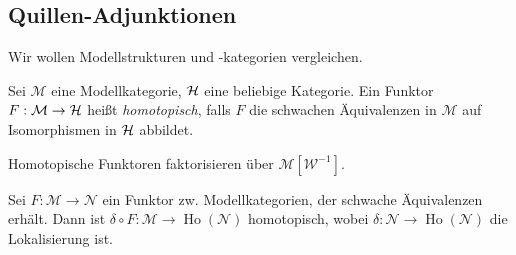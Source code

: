 \documentclass{cheat-sheet}
\newcommand{\Weak}{\mathcal{W}} %
\newcommand{\ModC}{\mathcal{M}} %
\newcommand{\NodC}{\mathcal{N}} %
\DeclareMathOperator{\Ho}{Ho} %
\newenvironment{centertikzcd}
  {\begin{center}\begin{tikzcd}}
  {\end{tikzcd}\end{center}}
\begin{document}



\subsection{Quillen-Adjunktionen}

\begin{motto}
  Wir wollen Modellstrukturen und -kategorien vergleichen.
\end{motto}


\begin{defn}
  Sei $\ModC$ eine Modellkategorie, $\mathcal{H}$ eine beliebige Kategorie.
  Ein Funktor $F : \ModC \to \HatC$ heißt \emph{homotopisch}, falls $F$ die schwachen Äquivalenzen in $\ModC$ auf Isomorphismen in $\mathcal{H}$ abbildet.
\end{defn}

\begin{bem}
  Homotopische Funktoren faktorisieren über $\ModC[\Weak^{-1}]$.
\end{bem}

\begin{bsp}
  Sei $F : \ModC \to \NodC$ ein Funktor zw. Modellkategorien, der schwache Äquivalenzen erhält.
  Dann ist $\delta \circ F : \ModC \to \Ho(\NodC)$ homotopisch, wobei $\delta : \NodC \to \Ho(\NodC)$ die Lokalisierung ist.
\end{bsp}
\end{document}
